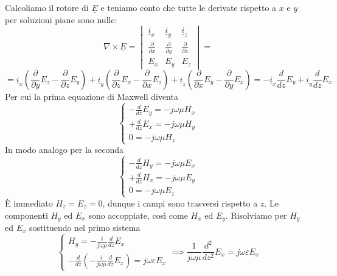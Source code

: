 \documentclass{book}
\begin{document}
    Calcoliamo il rotore di $\underline{E}$ e teniamo conto che tutte le derivate rispetto a $x$ e $y$ per soluzioni piane sono nulle:
    \begin{equation}
        \nabla \times \underline{E} = 
        \begin{vmatrix}
            \underline{i}_{x} & \underline{i}_{y} & \underline{i}_{z} \\
            \frac{\partial}{\partial x} & \frac{\partial}{\partial y} & \frac{\partial}{\partial z} \\
            E_{x} & E_{y} & E_{z} 
        \end{vmatrix} = 
    \end{equation}
    \begin{equation}
        = \underline{i}_{x} (\frac{\partial}{\partial y}E_{z}-\frac{\partial}{\partial z}E_{y}) + \underline{i}_{y} (\frac{\partial}{\partial z}E_{x}-\frac{\partial}{\partial x}E_{z})
        + \underline{i}_{z} (\frac{\partial}{\partial x}E_{y}-\frac{\partial}{\partial y}E_{x}) = -\underline{i}_{x} \frac{d}{dz}E_{y} + \underline{i}_{y} \frac{d}{dz}E_{x}
    \end{equation}
    Per cui la prima equazione di Maxwell diventa
    \begin{equation}
        \begin{cases}
            -\frac{d}{dz}E_{y} = -j \omega \mu H_{x} \\
            +\frac{d}{dz}E_{x} = -j \omega \mu H_{y} \\
            0 = -j \omega \mu H_{z}
        \end{cases}
    \end{equation}
    In modo analogo per la seconda
    \begin{equation}
        \begin{cases}
            -\frac{d}{dz}H_{y} = -j \omega \mu E_{x} \\
            +\frac{d}{dz}H_{x} = -j \omega \mu E_{y} \\
            0 = -j \omega \mu E_{z}
        \end{cases}
    \end{equation}
    È immediato $H_{z} = E_{z} = 0$, dunque i campi sono trasversi rispetto a $z$. Le componenti $H_{y}$ ed $E_{x}$ sono accoppiate, così come $H_{x}$ ed $E_{y}$.
    Risolviamo per $H_{y}$ ed $E_{x}$ sostituendo nel primo sistema
    \begin{equation}
        \begin{cases}
            H_{y} = - \frac{i}{j \omega \mu} \frac{d}{dz} E_{x} \\
            -\frac{d}{dz} (- \frac{i}{j \omega \mu}\frac{d}{dz}E_{x}) = j \omega \varepsilon E_{x}
        \end{cases} \implies \frac{1}{j \omega \mu} \frac{d^{2}}{dz^{2}}E_{x} = j \omega \varepsilon E_{x}
    \end{equation} 
\end{document}
